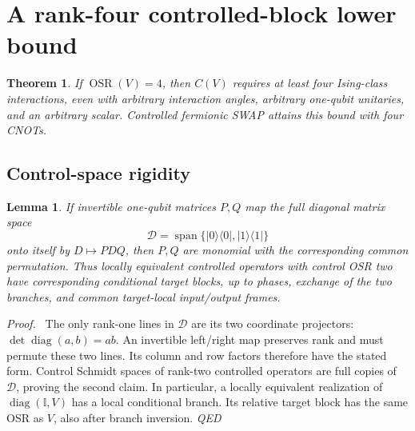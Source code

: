 \documentclass[a4paper,onecolumn,11pt,unpublished]{quantumarticle}
\newtheorem{theorem}{Theorem}
\newtheorem{lemma}{Lemma}
\newenvironment{proof}[1][Proof]{\par\noindent\textit{#1.}\ }{\hfill\textit{QED}\par}
\newcommand{\OSR}{\operatorname{OSR}}
\newcommand{\Id}{\mathbb I}
\begin{document}
\section{A rank-four controlled-block lower bound}
\begin{theorem}\label{thm:four}
If $\OSR(V)=4$, then $C(V)$ requires at least four Ising-class interactions,
even with arbitrary interaction angles, arbitrary one-qubit unitaries, and
an arbitrary scalar. Controlled fermionic SWAP attains this bound with
four CNOTs.
\end{theorem}
\subsection{Control-space rigidity}
\begin{lemma}\label{lem:rigidity}
If invertible one-qubit matrices $P,Q$ map the full diagonal matrix space
\[\mathcal D=\operatorname{span}\{|0\rangle\langle0|,
|1\rangle\langle1|\}\]
onto itself by $D\mapsto PDQ$, then $P,Q$
are monomial with the corresponding common permutation. Thus locally
equivalent controlled operators with control OSR two have corresponding
conditional target blocks, up to phases, exchange of the two branches,
and common target-local input/output frames.
\end{lemma}
\begin{proof}
The only rank-one lines in $\mathcal D$ are its two coordinate projectors:
$\det\operatorname{diag}(a,b)=ab$. An invertible left/right map preserves
rank and must permute these two lines. Its column and row factors
therefore have the stated form. Control Schmidt spaces of rank-two
controlled operators are full copies of $\mathcal D$, proving the second
claim. In particular, a locally equivalent realization of
$\operatorname{diag}(\Id,V)$ has a local conditional branch. Its relative
target block has the same OSR as $V$, also after branch inversion.
\end{proof}
\end{document}
